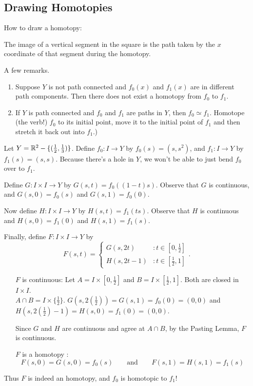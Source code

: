 \subsection{Drawing Homotopies}

How to draw a homotopy: \placeholder

The image of a vertical segment in the square is the path taken by the $x$ coordinate of that segment during the homotopy.

A few remarks. 
\begin{enumerate}
	\item Suppose $Y$ is not path connected and $f_0(x)$ and $f_1(x)$ are in different path components. Then there does not exist a homotopy from $f_0$ to $f_1$.\\
	\placeholder 
	\item If $Y$ is path connected and $f_0$ and $f_1$ are paths in $Y$, then $f_0 \simeq f_1$. Homotope (the verb!) $f_0$ to its initial point, move it to the initial point of $f_1$ and then stretch it back out into $f_1$.) \placeholder 
\end{enumerate}
\begin{example}
	Let $Y = \mathbb R^2 - \{(\frac{1}{2}, \frac{1}{3})\}$. Define $f_0: I \rightarrow Y$ by $f_0(s) = (s,s^2)$, and $f_1: I \rightarrow Y$ by $f_1(s) = (s,s).$ Because there's a hole in $Y$, we won't be able to just bend $f_0$ over to $f_1$.
	
	Define $G: I \times I \rightarrow Y$ by $G(s,t) = f_0((1-t)s)$. Observe that $G$ is continuous, and $G(s,0) = f_0(s)$ and $G(s,1) = f_0(0)$.
	
	Now define $H: I \times I \rightarrow Y$ by $H(s,t) = f_1(ts)$. Observe that $H$ is continuous and $H(s,0) = f_1(0)$ and $H(s,1) = f_1(s)$.
	
	Finally, define $F: I \times I \rightarrow Y$ by 
	\begin{displaymath}
		F(s, t) = \left\{ 
		\begin{array}{lr}
			G(s, 2t) & : t \in [0, \frac{1}{2}]\\
			H(s, 2t-1) & : t \in [\frac{1}{2}, 1] 
		\end{array}
		\right. . 
	\end{displaymath}
	\begin{itemize}
		\item[ $F$ is continuous: ] Let $A = I \times [0, \frac{1}{2}]$ and $B = I \times [\frac{1}{2}, 1]$. Both are closed in $I\times I$.\\
		$A \cap B = I \times \{\frac{1}{2}\}$. $G(s, 2(\frac{1}{2})) = G(s, 1) = f_0(0) = (0,0)$ and $H(s, 2(\frac{1}{2})-1) = H(s, 0) = f_1(0) = (0,0)$.
		
		Since $G$ and $H$ are continuous and agree at $A\cap B$, by the Pasting Lemma, $F$ is continuous.
		
		\item[$F$ is a homotopy : ]
		\[F(s, 0) = G(s, 0) = f_0(s) \qquad\text{and}\qquad F(s, 1) = H(s, 1) = f_1(s) \]
	\end{itemize}
	Thus $F$ is indeed an homotopy, and $f_0$ is homotopic to $f_1$! 
\end{example}

